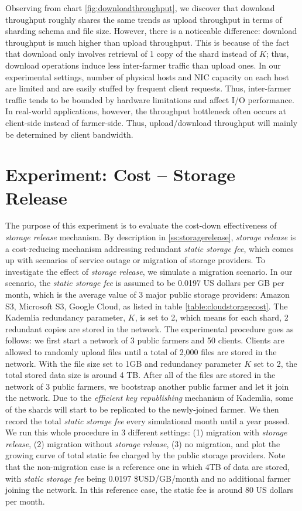 Observing from chart \ref{fig:downloadthroughput}, we discover that download throughput roughly shares the same trends as upload throughput in terms of sharding schema and file size. However, there is a noticeable difference: download throughput is much higher than upload throughput. This is because of the fact that download only involves retrieval of 1 copy of the shard instead of $K$; thus, download operations induce less inter-farmer traffic than upload ones. In our experimental settings, number of physical hosts and NIC capacity on each host are limited and are easily stuffed by frequent client requests. Thus, inter-farmer traffic tends to be bounded by hardware limitations and affect I/O performance. In real-world applications, however, the throughput bottleneck often occurs at client-side instead of farmer-side. Thus, upload/download throughput will mainly be determined by client bandwidth.

\section{Experiment: Cost -- Storage Release}
\label{s:expcoststoragerelease}

The purpose of this experiment is to evaluate the cost-down effectiveness of \textit{storage release} mechanism. By description in \ref{ss:storagerelease}, \textit{storage release} is a cost-reducing mechanism addressing redundant \textit{static storage fee}, which comes up with scenarios of service outage or migration of storage providers. To investigate the effect of \textit{storage release}, we simulate a migration scenario. In our scenario, the \textit{static storage fee} is assumed to be 0.0197 US dollars per GB per month, which is the average value of 3 major public storage providers: Amazon S3, Microsoft S3, Google Cloud, as listed in table \ref{table:cloudstoragecost}. The Kademlia redundancy parameter, $K$, is set to 2, which means for each shard, 2 redundant copies are stored in the network. The experimental procedure goes as follows: we first start a network of 3 public farmers and 50 clients. Clients are allowed to randomly upload files until a total of 2,000 files are stored in the network. With the file size set to 1GB and redundancy parameter $K$ set to 2, the total stored data size is around 4 TB. After all of the files are stored in the network of 3 public farmers, we bootstrap another public farmer and let it join the network. Due to the \textit{efficient key republishing} mechanism of Kademlia, some of the shards will start to be replicated to the newly-joined farmer. We then record the total \textit{static storage fee} every simulational month until a year passed. We run this whole procedure in 3 different settings: (1) migration with \textit{storage release}, (2) migration without \textit{storage release}, (3) no migration, and plot the growing curve of total static fee charged by the public storage providers. Note that the non-migration case is a reference one in which 4TB of data are stored, with \textit{static storage fee} being 0.0197 \$USD/GB/month and no additional farmer joining the network. In this reference case, the static fee is around 80 US dollars per month.

